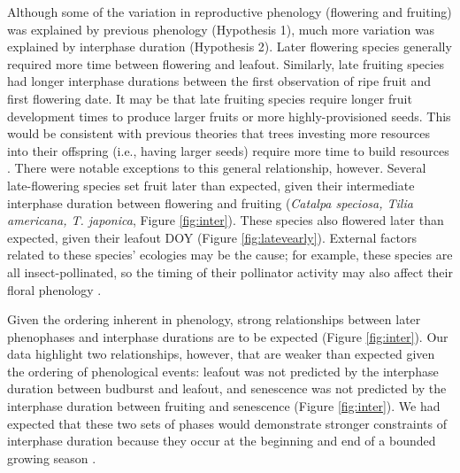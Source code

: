 \documentclass{article}
\begin{document}
\par Although some of the variation in reproductive phenology (flowering and fruiting) was explained by previous phenology (Hypothesis 1), much more variation was explained by interphase duration (Hypothesis 2). Later flowering species generally required more time between flowering and leafout. Similarly, late fruiting species had longer interphase durations between the first observation of ripe fruit and first flowering date. It may be that late fruiting species require longer fruit development times to produce larger fruits or more highly-provisioned seeds. This would be consistent with previous theories that trees investing more resources into their offspring (i.e., having larger seeds) require more time to build resources \citep{bolmgren2008,sun2011}. There were notable exceptions to this general relationship, however. Several late-flowering species  set fruit later than expected, given their intermediate interphase duration between flowering and fruiting (\textit{Catalpa speciosa, Tilia americana, T. japonica}, Figure \ref{fig:inter}). These species also flowered later than expected, given their leafout DOY (Figure \ref{fig:latevearly}). External factors related to these species' ecologies may be the cause; for example, these species are all insect-pollinated, so the timing of their pollinator activity may also affect their floral phenology \citep{elzinga2007}.  

\par Given the ordering inherent in phenology, strong relationships between later phenophases and interphase durations are to be expected (Figure \ref{fig:inter}).  Our data highlight two relationships, however, that are weaker than expected given the ordering of phenological events: leafout was not predicted by the interphase duration between budburst and leafout, and senescence was not predicted by the interphase duration between fruiting and senescence (Figure \ref{fig:inter}). We had expected that these two sets of phases would demonstrate stronger constraints of interphase duration because they occur at the beginning and end of a bounded growing season \citep{letten2013}.
\end{document}
